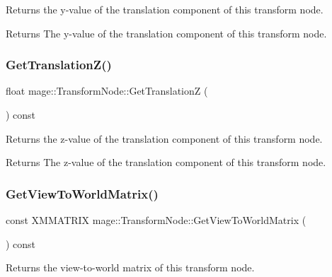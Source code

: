 Returns the y-\/value of the translation component of this transform node.

\begin{DoxyReturn}{Returns}
The y-\/value of the translation component of this transform node. 
\end{DoxyReturn}
\hypertarget{structmage_1_1_transform_node_a0a8ec0d7dcdb80443b973f314b98aa0a}{}\label{structmage_1_1_transform_node_a0a8ec0d7dcdb80443b973f314b98aa0a} 
\subsubsection{\texorpdfstring{Get\+Translation\+Z()}{GetTranslationZ()}}
{\footnotesize\ttfamily float mage\+::\+Transform\+Node\+::\+Get\+TranslationZ (\begin{DoxyParamCaption}{ }\end{DoxyParamCaption}) const\hspace{0.3cm}{\ttfamily [noexcept]}}

Returns the z-\/value of the translation component of this transform node.

\begin{DoxyReturn}{Returns}
The z-\/value of the translation component of this transform node. 
\end{DoxyReturn}
\hypertarget{structmage_1_1_transform_node_a16586bae5004e22d543b1b931407f603}{}\label{structmage_1_1_transform_node_a16586bae5004e22d543b1b931407f603} 
\subsubsection{\texorpdfstring{Get\+View\+To\+World\+Matrix()}{GetViewToWorldMatrix()}}
{\footnotesize\ttfamily const X\+M\+M\+A\+T\+R\+IX mage\+::\+Transform\+Node\+::\+Get\+View\+To\+World\+Matrix (\begin{DoxyParamCaption}{ }\end{DoxyParamCaption}) const\hspace{0.3cm}{\ttfamily [noexcept]}}

Returns the view-\/to-\/world matrix of this transform node.


